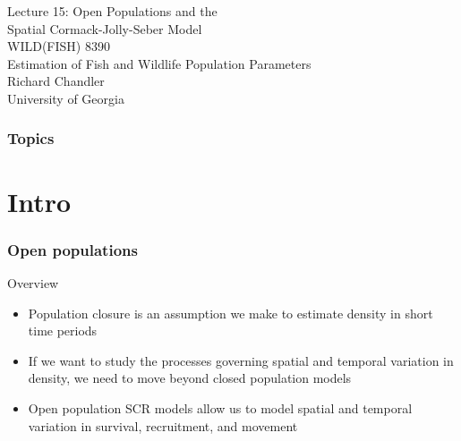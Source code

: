 \documentclass[color=usenames,dvipsnames]{beamer}\usepackage[]{graphicx}\usepackage[]{color}
\begin{document}
\begin{frame}[plain]
  \centering
  \LARGE
  Lecture 15: Open Populations and the \\
  Spatial Cormack-Jolly-Seber Model \\
  \vfill
  \large
  WILD(FISH) 8390 \\
  Estimation of Fish and Wildlife Population Parameters \\
  \vfill
  Richard Chandler \\
  University of Georgia \\
\end{frame}







\begin{frame}[plain]
  \frametitle{Topics}
  \Large
\end{frame}




\section{Intro}





\begin{frame}
  \frametitle{Open populations}
  \large
  Overview
  \begin{itemize}[<+->]
    \normalsize
    \item Population closure is an assumption we make to estimate
      density in short time periods
    \item If we want to study the processes governing spatial and
      temporal variation in density, we need to move beyond closed
      population models
    \item Open population SCR models allow us to model spatial and
      temporal variation in survival, recruitment, and movement
  \end{itemize}
\end{frame}
\end{document}
